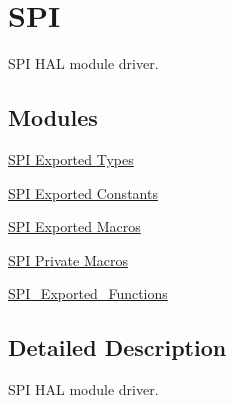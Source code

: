 \hypertarget{group___s_p_i}{}\section{S\+PI}
\label{group___s_p_i}


S\+PI H\+AL module driver.  


\subsection*{Modules}
\begin{DoxyCompactItemize}
\item 
\hyperlink{group___s_p_i___exported___types}{S\+P\+I Exported Types}
\item 
\hyperlink{group___s_p_i___exported___constants}{S\+P\+I Exported Constants}
\item 
\hyperlink{group___s_p_i___exported___macros}{S\+P\+I Exported Macros}
\item 
\hyperlink{group___s_p_i___private___macros}{S\+P\+I Private Macros}
\item 
\hyperlink{group___s_p_i___exported___functions}{S\+P\+I\+\_\+\+Exported\+\_\+\+Functions}
\end{DoxyCompactItemize}


\subsection{Detailed Description}
S\+PI H\+AL module driver. 

